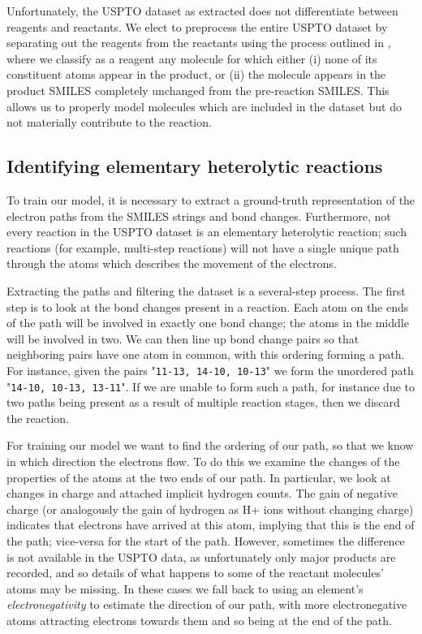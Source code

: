 Unfortunately, the USPTO dataset as extracted does not differentiate between reagents and reactants.
We elect to preprocess the entire USPTO dataset by separating out the reagents from the reactants using the process outlined in \citet{schwaller2017found}, where we classify as a reagent any molecule for which either 
(i) none of its constituent atoms appear in the product, or 
(ii) the molecule appears in the product SMILES completely unchanged from the pre-reaction SMILES.
This allows us to properly model molecules which are included in the dataset but do not materially contribute to the reaction.

\subsection{Identifying elementary heterolytic reactions}

To train our model, it is necessary to extract a ground-truth representation of the electron paths from the SMILES strings and bond changes.
Furthermore, not every reaction in the USPTO dataset is an elementary heterolytic reaction; 
such reactions (for example, multi-step reactions) will not have a single unique path through the atoms 
which describes the movement of the electrons.

Extracting the paths and filtering the dataset is a several-step process.
The first step is to look at the bond changes present in a reaction. 
Each atom on the ends of the path will be involved in exactly one bond change;
the atoms in the middle will be involved in two. 
We can then line up bond change pairs so that neighboring pairs have one atom in common,
 with this ordering forming a path.
For instance, given the pairs "\texttt{11-13, 14-10, 10-13}" we form the unordered path "\texttt{14-10, 10-13, 13-11}".
If we are unable to form such a path, for instance due to two paths being present as a result of multiple reaction stages, then we discard the reaction.

For training our model we want to find the ordering of our path, so that we know in which direction the electrons flow.
To do this we examine the changes of the properties of the atoms at the two ends of our path. 
In particular, we look at changes in charge and attached implicit hydrogen counts. 
The gain of negative charge (or analogously the gain of hydrogen as H+ ions without changing charge) indicates that electrons have arrived at this atom, 
implying that this is the end of the path; 
vice-versa for the start of the path.
However, sometimes the difference is not available in the USPTO data, as unfortunately only major products are recorded, and so details of what happens to some of the reactant molecules' atoms may be missing.
In these cases we fall back to using an element's {\em electronegativity} to estimate the direction of our path, with more electronegative atoms attracting electrons towards them and so being at the end of the path. 

